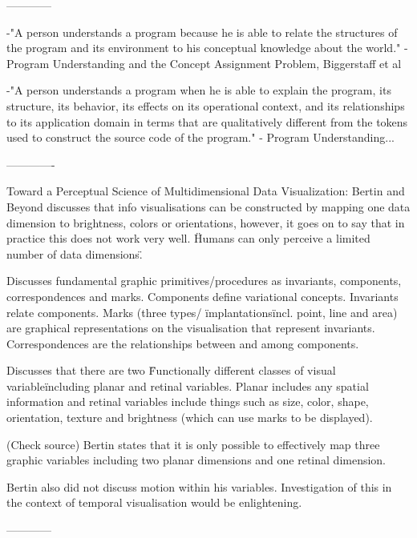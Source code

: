 ------------

-"A person understands a program because he is able to relate the structures of the program and its environment to his conceptual knowledge about the world." - Program Understanding and the Concept Assignment Problem, Biggerstaff et al

-"A person understands a program when he is able to explain the program, its structure, its behavior, its effects on its operational context, and its relationships to its application domain in terms that are qualitatively different from the tokens used to construct the source code of the program." - Program Understanding...

-------------

Toward a Perceptual Science of Multidimensional Data Visualization: Bertin and Beyond discusses that info visualisations can be constructed by mapping one data dimension to brightness, colors or orientations, however, it goes on to say that in practice this does not work very well. \"Humans can only perceive a limited number of data dimensions\".

Discusses fundamental graphic primitives/procedures as invariants, components, correspondences and marks. Components define variational concepts. Invariants relate components. Marks (three types/ \"implantations\" incl. point, line and area) are graphical representations on the visualisation that represent invariants. Correspondences are the relationships between and among components.

Discusses that there are two \"Functionally different classes of visual variable\" including planar and retinal variables. Planar includes any spatial information and retinal variables include things such as size, color, shape, orientation, texture and brightness (which can use marks to be displayed).

(Check source) Bertin states that it is only possible to effectively map three graphic variables including two planar dimensions and one retinal dimension.

Bertin also did not discuss motion within his variables. Investigation of this in the context of temporal visualisation would be enlightening.

------------




